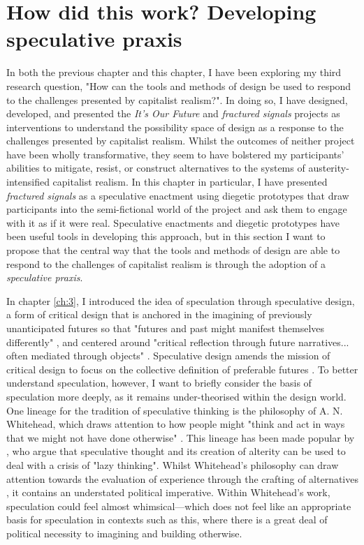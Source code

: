 \section{How did this work? Developing speculative praxis}

In both the previous chapter and this chapter, I have been exploring my third research question, "How can the tools and methods of design be used to respond to the challenges presented by capitalist realism?". In doing so, I have designed, developed, and presented the \textit{It's Our Future} and \textit{fractured signals} projects as interventions to understand the possibility space of design as a response to the challenges presented by capitalist realism. Whilst the outcomes of neither project have been wholly transformative, they seem to have bolstered my participants' abilities to mitigate, resist, or construct alternatives to the systems of austerity-intensified capitalist realism. In this chapter in particular, I have presented \textit{fractured signals} as a speculative enactment using diegetic prototypes that draw participants into the semi-fictional world of the project and ask them to engage with it as if it were real. Speculative enactments and diegetic prototypes have been useful tools in developing this approach, but in this section I want to propose that the central way that the tools and methods of design are able to respond to the challenges of capitalist realism is through the adoption of a \textit{speculative praxis}.

In chapter \ref{ch:3}, I introduced the idea of speculation through speculative design, a form of critical design that is anchored in the imagining of previously unanticipated futures so that "futures and past might manifest themselves differently" \citep[p. 1]{gatehouse_hauntology_2020}, and centered around "critical reflection through future narratives... often mediated through objects" \citep{forlano_ethnographies_2013}. Speculative design amends the mission of critical design to focus on the collective definition of preferable futures \cite[p. 6]{dunne_speculative_2013}. To better understand speculation, however, I want to briefly consider the basis of speculation more deeply, as it remains under-theorised within the design world. One lineage for the tradition of speculative thinking is the philosophy of A. N. Whitehead, which draws attention to how people might "think and act in ways that we might not have done otherwise" \citep[p. 2]{shaviro_defining_2019}. This lineage has been made popular by \citet[p. 14]{debaise_insistence_2016}, who argue that speculative thought and its creation of alterity can be used to deal with a crisis of "lazy thinking". Whilst Whitehead's philosophy can draw attention towards the evaluation of experience through the crafting of alternatives \citep[p. 2]{williams_abstract_2022}, it contains an understated political imperative. Within Whitehead's work, speculation could feel almost whimsical—which does not feel like an appropriate basis for speculation in contexts such as this, where there is a great deal of political necessity to imagining and building otherwise. 

